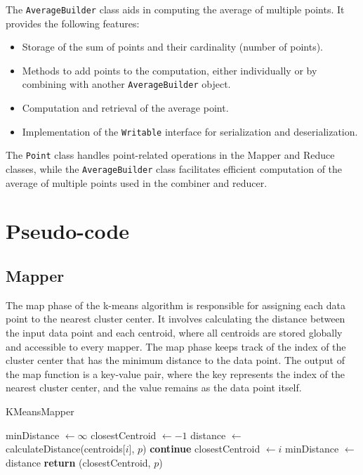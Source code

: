 \documentclass[parskip=full]{report}
\begin{document}
	The \texttt{AverageBuilder} class aids in computing the average of multiple points. It provides the following features:

	\begin{itemize}
		\item Storage of the sum of points and their cardinality (number of points).
		\item Methods to add points to the computation, either individually or by combining with another \texttt{AverageBuilder} object.
		\item Computation and retrieval of the average point.
		\item Implementation of the \texttt{Writable} interface for serialization and deserialization.
	\end{itemize}

	The \texttt{Point} class handles point-related operations in the Mapper and Reduce classes, while the \texttt{AverageBuilder} class facilitates efficient computation of the average of multiple points used in the combiner and reducer.



\section{Pseudo-code}

\subsection{Mapper}
The map phase of the k-means algorithm is responsible for assigning each data point to the nearest cluster center. It involves calculating the distance between the input data point and each centroid, where all centroids are stored globally and accessible to every mapper. The map phase keeps track of the index of the cluster center that has the minimum distance to the data point. The output of the map function is a key-value pair, where the key represents the index of the nearest cluster center, and the value remains as the data point itself.


	\begin{algorithm}
		\caption{KMeansMapper}
		\begin{algorithmic}[1]


			\State minDistance $\gets \infty$
			\State closestCentroid $\gets -1$
			\State distance $\gets$ calculateDistance(centroids[$i$], $p$)
			\State \textbf{continue}
			\EndIf
			\State closestCentroid $\gets i$
			\State minDistance $\gets$ distance
			\EndFor
			\State \textbf{return} (closestCentroid, $p$)

			\EndProcedure
		\end{algorithmic}
	\end{algorithm}
\end{document}
